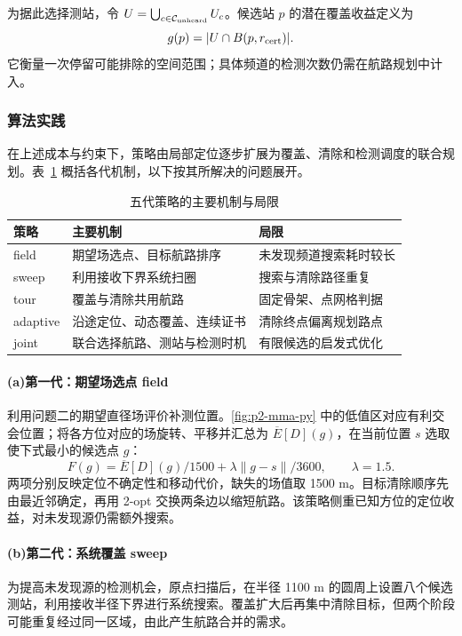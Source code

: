 为据此选择测站，令 $U=\bigcup_{c\in \mathcal C_{\rm unheard}}U_c$。候选站 $p$ 的潜在覆盖收益定义为
\begin{equation}\label{eq:q3-gain}
 g(p)=|U\cap B(p,r_{\rm cert})|.
\end{equation}
它衡量一次停留可能排除的空间范围；具体频道的检测次数仍需在航路规划中计入。

\subsubsection{算法实践}
在上述成本与约束下，策略由局部定位逐步扩展为覆盖、清除和检测调度的联合规划。表~\ref{tab:q3-generations} 概括各代机制，以下按其所解决的问题展开。
\begin{table}[!htbp]\centering
\caption{五代策略的主要机制与局限}\label{tab:q3-generations}
\begin{tabular}{@{}lp{}p{}@{}}\toprule
策略 & 主要机制 & 局限\\\midrule
field & 期望场选点、目标航路排序 & 未发现频道搜索耗时较长\\
sweep & 利用接收下界系统扫圈 & 搜索与清除路径重复\\
tour & 覆盖与清除共用航路 & 固定骨架、点网格判据\\
adaptive & 沿途定位、动态覆盖、连续证书 & 清除终点偏离规划路点\\
joint & 联合选择航路、测站与检测时机 & 有限候选的启发式优化\\\bottomrule
\end{tabular}\end{table}

\paragraph{\textbf{(a)}\hspace{0.2em}第一代：期望场选点 field}
利用问题二的期望直径场评价补测位置。\cref{fig:p2-mma-py} 中的低值区对应有利交会位置；将各方位对应的场旋转、平移并汇总为 $\overline E[D](g)$，在当前位置 $s$ 选取使下式最小的候选点 $g$：
\begin{equation}\label{eq:q3-field}
 F(g)=\overline E[D](g)/1500+\lambda\|g-s\|/3600,\qquad\lambda=1.5.
\end{equation}
两项分别反映定位不确定性和移动代价，缺失的场值取 1500 m。目标清除顺序先由最近邻确定，再用 2-opt 交换两条边以缩短航路。该策略侧重已知方位的定位收益，对未发现源仍需额外搜索。

\paragraph{\textbf{(b)}\hspace{0.2em}第二代：系统覆盖 sweep}
为提高未发现源的检测机会，原点扫描后，在半径 1100 m 的圆周上设置八个候选测站，利用接收半径下界进行系统搜索。覆盖扩大后再集中清除目标，但两个阶段可能重复经过同一区域，由此产生航路合并的需求。

